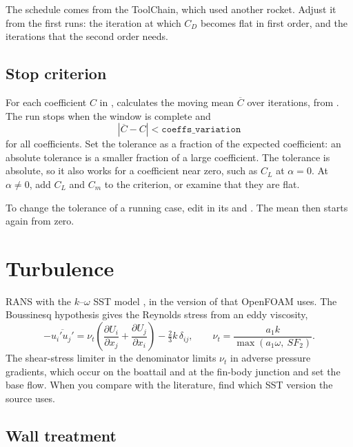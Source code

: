\medskip
The schedule comes from the ToolChain, which used another rocket. Adjust it from the
first runs: the iteration at which $C_D$ becomes flat in first order, and the
iterations that the second order needs.

\subsection{Stop criterion}\label{sec:stop-criterion}

For each coefficient $C$ in ,  calculates the
moving mean $\overline{C}$ over  iterations, from . The
run stops when the window is complete and
\[
  |\overline{C} - C| < \texttt{coeffs\_variation}
\]
for all coefficients. Set the tolerance as a fraction of the expected coefficient: an
absolute tolerance is a smaller fraction of a large coefficient. The tolerance is
absolute, so it also works for a coefficient near zero, such as $C_L$ at $\alpha = 0$.
At $\alpha \neq 0$, add $C_L$ and $C_m$ to the criterion, or examine that they are flat.

To change the tolerance of a running case, edit  in its
 and . The mean then
starts again from zero.

\section{Turbulence}\label{sec:turbulence}

RANS with the $k$--$\omega$ SST model \citep{menter1994}, in the version of
\citet{menter2003} that OpenFOAM uses. The Boussinesq hypothesis gives the Reynolds
stress from an eddy viscosity,
\[
  -\overline{u_i'u_j'} = \nu_t\left(\frac{\partial U_i}{\partial x_j} + \frac{\partial U_j}{\partial x_i}\right) - \tfrac23 k\,\delta_{ij},
  \qquad
  \nu_t = \frac{a_1 k}{\max(a_1\omega,\ S F_2)}.
\]
The shear-stress limiter in the denominator limits $\nu_t$ in adverse pressure
gradients, which occur on the boattail and at the fin-body junction and set the base
flow. When you compare with the literature, find which SST version the source uses.

\subsection{Wall treatment}\label{sec:wall-treatment}

